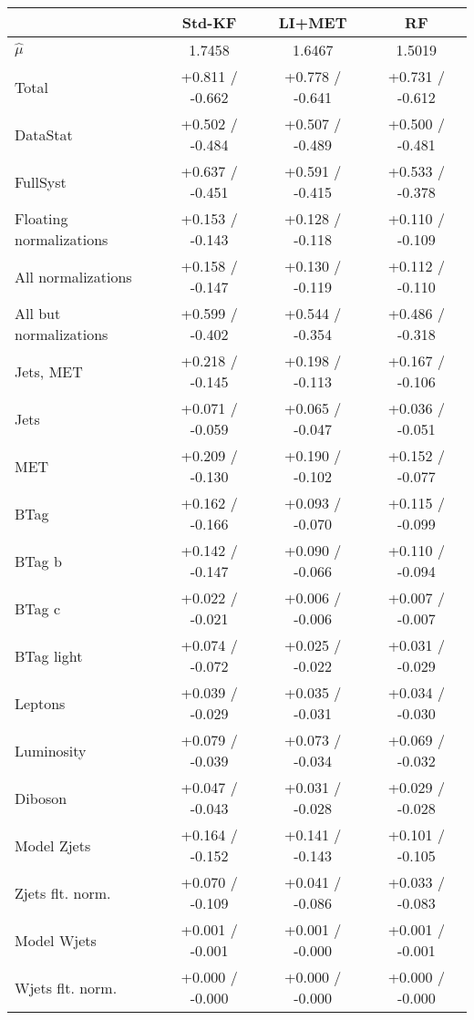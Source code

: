 \begin{table}[!htbp]\captionsetup{justification=centering}
\begin{center}
\begin{tabular}{lccc}
\hline\hline
 &Std-KF &LI+MET &RF\\
\hline
$\hat{\mu}$ & 1.7458 & 1.6467 & 1.5019\\
\hline
Total &  +0.811 / -0.662  &  +0.778 / -0.641  &  +0.731 / -0.612 \\
\hline
DataStat &  +0.502 / -0.484  &  +0.507 / -0.489  &  +0.500 / -0.481 \\
FullSyst &  +0.637 / -0.451  &  +0.591 / -0.415  &  +0.533 / -0.378 \\
Floating normalizations &  +0.153 / -0.143  &  +0.128 / -0.118  &  +0.110 / -0.109 \\
All normalizations &  +0.158 / -0.147  &  +0.130 / -0.119  &  +0.112 / -0.110 \\
All but normalizations &  +0.599 / -0.402  &  +0.544 / -0.354  &  +0.486 / -0.318 \\
\hline
Jets, MET &  +0.218 / -0.145  &  +0.198 / -0.113  &  +0.167 / -0.106 \\
Jets &  +0.071 / -0.059  &  +0.065 / -0.047  &  +0.036 / -0.051 \\
MET &  +0.209 / -0.130  &  +0.190 / -0.102  &  +0.152 / -0.077 \\
BTag &  +0.162 / -0.166  &  +0.093 / -0.070  &  +0.115 / -0.099 \\
BTag b &  +0.142 / -0.147  &  +0.090 / -0.066  &  +0.110 / -0.094 \\
BTag c &  +0.022 / -0.021  &  +0.006 / -0.006  &  +0.007 / -0.007 \\
BTag light &  +0.074 / -0.072  &  +0.025 / -0.022  &  +0.031 / -0.029 \\
Leptons &  +0.039 / -0.029  &  +0.035 / -0.031  &  +0.034 / -0.030 \\
Luminosity &  +0.079 / -0.039  &  +0.073 / -0.034  &  +0.069 / -0.032 \\
Diboson &  +0.047 / -0.043  &  +0.031 / -0.028  &  +0.029 / -0.028 \\
Model Zjets &  +0.164 / -0.152  &  +0.141 / -0.143  &  +0.101 / -0.105 \\
Zjets flt. norm. &  +0.070 / -0.109  &  +0.041 / -0.086  &  +0.033 / -0.083 \\
Model Wjets &  +0.001 / -0.001  &  +0.001 / -0.000  &  +0.001 / -0.001 \\
Wjets flt. norm. &  +0.000 / -0.000  &  +0.000 / -0.000  &  +0.000 / -0.000 \\

\end{tabular}
\end{center}
\end{table}
